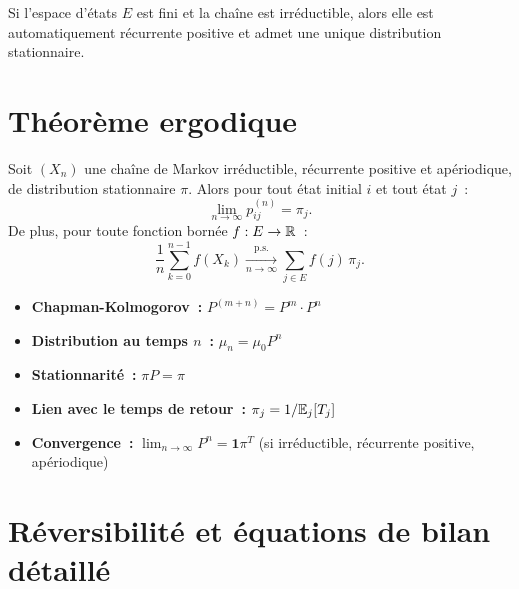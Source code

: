 \begin{remarque}
Si l'espace d'\'etats $E$ est fini et la cha\^ine est irr\'eductible, alors elle est
automatiquement r\'ecurrente positive et admet une unique distribution stationnaire.
\end{remarque}

\section{Th\'eor\`eme ergodique}

\begin{theoreme}
\label{thm:ergodique}
Soit $(X_n)$ une cha\^ine de Markov irr\'eductible, r\'ecurrente positive et
ap\'eriodique, de distribution stationnaire $\pi$. Alors pour tout \'etat initial
$i$ et tout \'etat $j$~:
\[
    \lim_{n \to \infty} p_{ij}^{(n)} = \pi_j.
\]
De plus, pour toute fonction born\'ee $f : E \to \mathbb{R}$~:
\[
    \frac{1}{n} \sum_{k=0}^{n-1} f(X_k) \xrightarrow[n \to \infty]{\text{p.s.}} \sum_{j \in E} f(j)\, \pi_j.
\]
\end{theoreme}

\begin{formules}[title=\textbf{Formules cl\'es des cha\^ines de Markov}]
\begin{itemize}
    \item \textbf{Chapman-Kolmogorov~:} $P^{(m+n)} = P^m \cdot P^n$
    \item \textbf{Distribution au temps $n$~:} $\mu_n = \mu_0 P^n$
    \item \textbf{Stationnarit\'e~:} $\pi P = \pi$
    \item \textbf{Lien avec le temps de retour~:} $\pi_j = 1/\mathbb{E}_j[T_j]$
    \item \textbf{Convergence~:} $\lim_{n \to \infty} P^n = \mathbf{1} \pi^T$
    (si irr\'eductible, r\'ecurrente positive, ap\'eriodique)
\end{itemize}
\end{formules}

\section{R\'eversibilit\'e et \'equations de bilan d\'etaill\'e}

